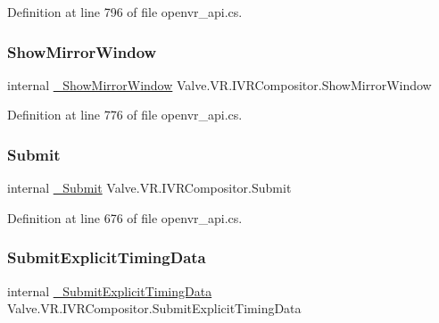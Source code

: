 Definition at line 796 of file openvr\+\_\+api.\+cs.

\mbox{\label{struct_valve_1_1_v_r_1_1_i_v_r_compositor_a9c2ff7d65d34419d7160d678f8b57e0a}} 
\subsubsection{\texorpdfstring{ShowMirrorWindow}{ShowMirrorWindow}}
{\footnotesize\ttfamily internal \mbox{\hyperlink{struct_valve_1_1_v_r_1_1_i_v_r_compositor_a752ed27fd9773cc53b3be5e0d7cd2556}{\+\_\+\+Show\+Mirror\+Window}} Valve.\+V\+R.\+I\+V\+R\+Compositor.\+Show\+Mirror\+Window}



Definition at line 776 of file openvr\+\_\+api.\+cs.

\mbox{\label{struct_valve_1_1_v_r_1_1_i_v_r_compositor_abe6d8cca56250c7520eb5680b59726e0}} 
\subsubsection{\texorpdfstring{Submit}{Submit}}
{\footnotesize\ttfamily internal \mbox{\hyperlink{struct_valve_1_1_v_r_1_1_i_v_r_compositor_a1422994a772786e464dde9703ca9bd7f}{\+\_\+\+Submit}} Valve.\+V\+R.\+I\+V\+R\+Compositor.\+Submit}



Definition at line 676 of file openvr\+\_\+api.\+cs.

\mbox{\label{struct_valve_1_1_v_r_1_1_i_v_r_compositor_af9a37b27e8eaea8c44e974cfe051086b}} 
\subsubsection{\texorpdfstring{SubmitExplicitTimingData}{SubmitExplicitTimingData}}
{\footnotesize\ttfamily internal \mbox{\hyperlink{struct_valve_1_1_v_r_1_1_i_v_r_compositor_a5db66fc4dafe46e41c5cf85bf8d1c719}{\+\_\+\+Submit\+Explicit\+Timing\+Data}} Valve.\+V\+R.\+I\+V\+R\+Compositor.\+Submit\+Explicit\+Timing\+Data}



